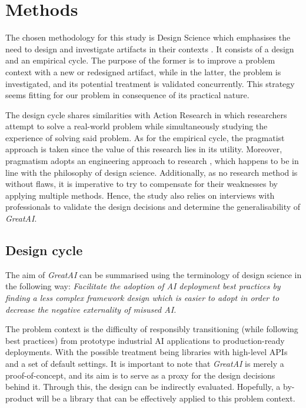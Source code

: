 \chapter{Methods} \label{chapter:methods}

The chosen methodology for this study is Design Science which emphasises the need to design and investigate artifacts in their contexts \cite{wieringa2014design}. It consists of a design and an empirical cycle. The purpose of the former is to improve a problem context with a new or redesigned artifact, while in the latter, the problem is investigated, and its potential treatment is validated concurrently. This strategy seems fitting for our problem in consequence of its practical nature.

The design cycle shares similarities with Action Research \cite{davison2004principles} in which researchers attempt to solve a real-world problem while simultaneously studying the experience of solving said problem. As for the empirical cycle, the pragmatist approach is taken since the value of this research lies in its utility. Moreover, pragmatism adopts an engineering approach to research \cite{shull2007guide}, which happens to be in line with the philosophy of design science. Additionally, as no research method is without flaws, it is imperative to try to compensate for their weaknesses by applying multiple methods. Hence, the study also relies on interviews with professionals to validate the design decisions and determine the generalisability of \textit{GreatAI}.

\section{Design cycle}

The aim of \textit{GreatAI} can be summarised using the terminology of design science in the following way: 
\textit{Facilitate the adoption of AI deployment best practices
by finding a less complex framework design 
which is easier to adopt
in order to decrease the negative externality of misused AI.}

The problem context is the difficulty of responsibly transitioning (while following best practices) from prototype industrial AI applications to production-ready deployments. With the possible treatment being libraries with high-level APIs and a set of default settings. It is important to note that \textit{GreatAI} is merely a proof-of-concept, and its aim is to serve as a proxy for the design decisions behind it. Through this, the design can be indirectly evaluated. Hopefully, a by-product will be a library that can be effectively applied to this problem context.

